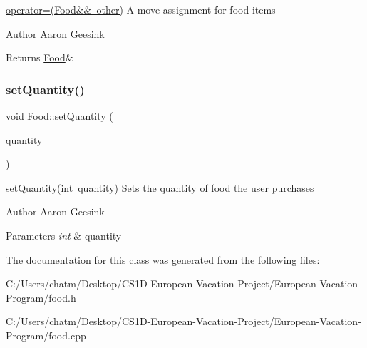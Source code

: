 \mbox{\hyperlink{class_food_a0ba9d6f416f396bc8e4a1c2ad519d3eb}{operator=(\+Food\&\& other)}} A move assignment for food items 

\begin{DoxyAuthor}{Author}
Aaron Geesink 
\end{DoxyAuthor}
\begin{DoxyReturn}{Returns}
\mbox{\hyperlink{class_food}{Food}}\& 
\end{DoxyReturn}
\mbox{\label{class_food_aa29cc2869e2607983876962343c12809}} 
\subsubsection{\texorpdfstring{setQuantity()}{setQuantity()}}
{\footnotesize\ttfamily void Food\+::set\+Quantity (\begin{DoxyParamCaption}\item[{int}]{quantity }\end{DoxyParamCaption})}



\mbox{\hyperlink{class_food_aa29cc2869e2607983876962343c12809}{set\+Quantity(int quantity)}} Sets the quantity of food the user purchases 

\begin{DoxyAuthor}{Author}
Aaron Geesink 
\end{DoxyAuthor}

\begin{DoxyParams}{Parameters}
{\em int} & quantity \\
\hline
\end{DoxyParams}


The documentation for this class was generated from the following files\+:\begin{DoxyCompactItemize}
\item 
C\+:/\+Users/chatm/\+Desktop/\+C\+S1\+D-\/\+European-\/\+Vacation-\/\+Project/\+European-\/\+Vacation-\/\+Program/food.\+h\item 
C\+:/\+Users/chatm/\+Desktop/\+C\+S1\+D-\/\+European-\/\+Vacation-\/\+Project/\+European-\/\+Vacation-\/\+Program/food.\+cpp\end{DoxyCompactItemize}

